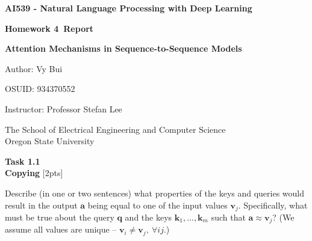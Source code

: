 \documentclass[12pt,article]{article}
\newcommand\projnumber{4}
\newenvironment{task}[2][Task]
    { \begin{mdframed}[backgroundcolor=gray!20] \textbf{#1 #2} \\}
    {  \end{mdframed}}
\begin{document}
\begin{titlepage}
    \begin{center}
        \vspace*{4cm}

        \textbf{\Large AI539 - Natural Language Processing with Deep Learning}

        \vspace{0.5cm}
 
        \textbf{ Homework \projnumber \ Report}

        \textbf{ Attention Mechanisms in Sequence-to-Sequence Models }
 
        \vspace{1cm}

        Author: Vy Bui

        OSUID: 934370552

        \vspace{1cm}

        Instructor: Professor Stefan Lee
        \vfill
             
        \vspace{0.8cm}
      
             
        The School of Electrical Engineering and Computer Science\\
        Oregon State University\\
             
    \end{center}
\end{titlepage}


%

\begin{task}{1.1} 
\textbf{Copying} [2pts]

Describe (in one or two sentences) what properties of the keys and queries would result in the output $\mathbf{a}$ being equal to one of the input values $\mathbf{v}_j$. Specifically, what must be true about the query $\mathbf{q}$ and the keys $\mathbf{k}_1, ..., \mathbf{k}_m$ such that $\mathbf{a} \approx \mathbf{v}_j$? (We assume all values are unique -- $\mathbf{v}_i \neq \mathbf{v}_j,~\forall ij$.)
\end{task}
\end{document}
